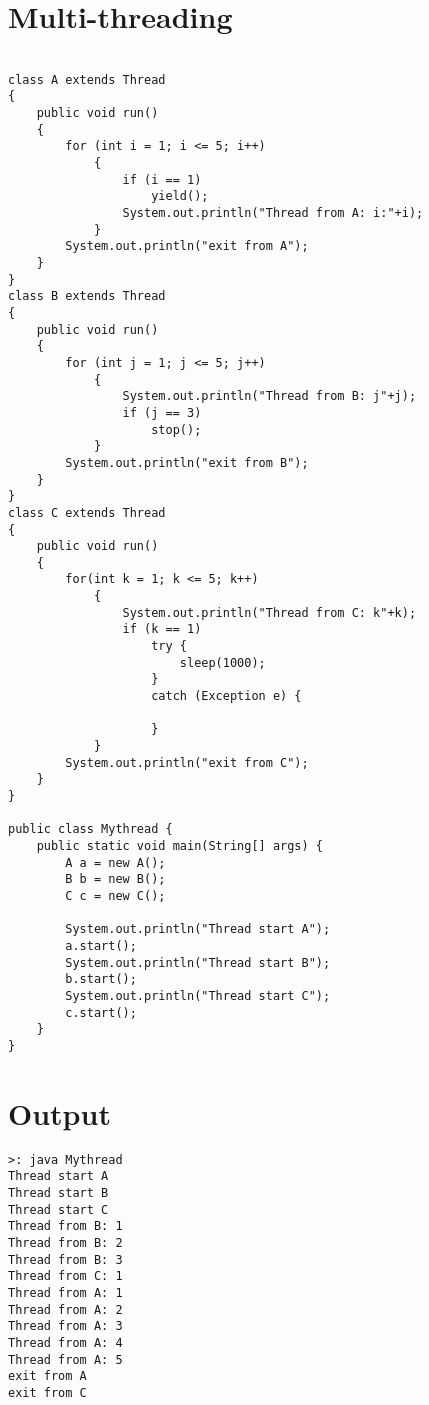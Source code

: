 \pagebreak{}
\section{Multi-threading}
\begin{verbatim}

class A extends Thread
{
    public void run()
    {
        for (int i = 1; i <= 5; i++)
            {
                if (i == 1)
                    yield();
                System.out.println("Thread from A: i:"+i);
            }
        System.out.println("exit from A");
    }
}
class B extends Thread
{
    public void run()
    {
        for (int j = 1; j <= 5; j++)
            {
                System.out.println("Thread from B: j"+j);
                if (j == 3)
                    stop();
            }
        System.out.println("exit from B");
    }
}
class C extends Thread
{
    public void run()
    {
        for(int k = 1; k <= 5; k++)
            {
                System.out.println("Thread from C: k"+k);
                if (k == 1)
                    try {
                        sleep(1000);
                    }
                    catch (Exception e) {

                    }
            }
        System.out.println("exit from C");
    }
}

public class Mythread {
    public static void main(String[] args) {
        A a = new A();
        B b = new B();
        C c = new C();

        System.out.println("Thread start A");
        a.start();
        System.out.println("Thread start B");
        b.start();
        System.out.println("Thread start C");
        c.start();
    }
}

\end{verbatim}

\section*{Output}
\begin{verbatim}
>: java Mythread
Thread start A
Thread start B
Thread start C
Thread from B: 1
Thread from B: 2
Thread from B: 3
Thread from C: 1
Thread from A: 1
Thread from A: 2
Thread from A: 3
Thread from A: 4
Thread from A: 5
exit from A
exit from C
\end{verbatim}